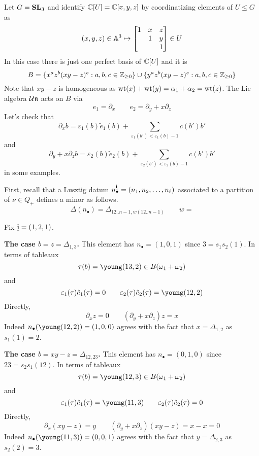 \begin{example} %
    Let $G=\SL_3$ and identify $\CC[U] = \CC[x,y,z]$ by coordinatizing elements of $U\le G$ as 
    \[
    (x,y,z) \in \AA^3 \mapsto \begin{bmatrix}
        1 & x & z \\
          & 1 & y \\
          &   & 1 
    \end{bmatrix} \in U    
    \]
    In this case there is just one perfect basis \cite{XYZ} of $\CC[U]$ and it is
    \begin{equation}
        B = \{
            x^a z^b (xy-z)^c : a,b,c \in \ZZ_{\ge 0}    
        \} \cup \{
            y^a z^b (xy-z)^c : a,b,c \in \ZZ_{\ge 0}  
        \}
    \end{equation}
    Note that $xy-z$ is homogeneous as $\wt(x) + \wt(y) = \alpha_1 + \alpha_2 = \wt (z)$. 
    The Lie algebra $\cU\n$ acts on $B$ via 
    \begin{equation}
        e_1 = \partial_x \qquad e_2 = \partial_y + x \partial_z
    \end{equation}
    Let's check that 
    \[
        \partial_xb = \varepsilon_1(b) \tilde e_1 (b) + \sum_{\varepsilon_1(b') < \varepsilon_1(b) - 1} c(b') b'
    \]
    and 
    \[
        \partial_y + x \partial_zb = \varepsilon_2(b) \tilde e_2(b) + \sum_{\varepsilon_2(b') < \varepsilon_2(b) - 1} c(b') b'  
    \]
    in some examples. 

    First, recall that a Lusztig datum $n_\bullet^{\uvi} = (n_1,n_2,\dots,n_\ell)$ associated to a partition of $\nu\in Q_+$ defines a minor as follows. 
    \[
        \Delta(n_\bullet) = \Delta_{12..n-1,w(12..n-1)} \qquad w=
    \]

    Fix $\uvi = (1,2,1)$. 


    {\bf The case $b=z = \Delta_{1,3}$.} This element has $n_\bullet = (1,0,1)$ since $3 = s_1 s_2 (1)$. In terms of tableaux
    \[
        \tau(b) = \young(13,2) \in B(\omega_1 + \omega_2)
    \]
    and 
    \[
        \varepsilon_1(\tau) \tilde e_1 (\tau) = 0  \qquad \varepsilon_2(\tau) \tilde e_2 (\tau) = \young(12,2)    
    \]
    Directly, 
    \[
        \partial_x z = 0 \qquad (\partial_y + x \partial_z)z = x    
    \]
    Indeed $n_\bullet(\young(12,2)) = (1,0,0)$ agrees with the fact that $x = \Delta_{1,2}$ as $s_1(1) = 2$. 
    
    {\bf The case $b = xy-z = \Delta_{12,23}$.} This element has $n_\bullet = (0,1,0)$ since $23 = s_2s_1(12)$. In terms of tableaux
    \[
        \tau(b) = \young(12,3) \in B(\omega_1 + \omega_2)
    \]
    and 
    \[\varepsilon_1(\tau) \tilde e_1 (\tau) = \young(11,3)  \qquad \varepsilon_2(\tau) \tilde e_2 (\tau) = 0 \]
    Directly, 
    \[
        \partial_x (xy-z) = y \qquad (\partial_y + x \partial_z) (xy-z) = x - x = 0     
    \]
    Indeed $n_\bullet(\young(11,3)) = (0,0,1)$ agrees with the fact that $y = \Delta_{2,3}$ as $s_2(2) = 3$. 
    

\end{example}
